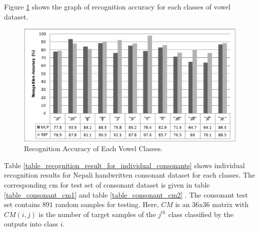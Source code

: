 Figure \ref{figure_recognition_accuracy_vowels} shows the graph of recognition accuracy for each classes of vowel dataset.
\begin{figure}[h]
\centering
\includegraphics[scale=0.60]{figures/experiments/recognition_accuracy_vowels.eps}
\caption{Recognition Accuracy of Each Vowel Classes.}
\label{figure_recognition_accuracy_vowels}
\end{figure}


Table \ref{table_recognition_result_for_individual_consonants} shows individual recognition results for Nepali handwritten consonant dataset for each classes. The corresponding \ac{cm}  for test set of consonant dataset is given in table \ref{table_consonant_cm1} and table \ref{table_consonant_cm2} . The consonant test set contains $891$ random samples for testing. Here, $CM$ is an $36$x$36$ matrix with $CM(i,j)$ is the number of target samples of the $j^{th}$ class classified by the outputs into class $i$.

